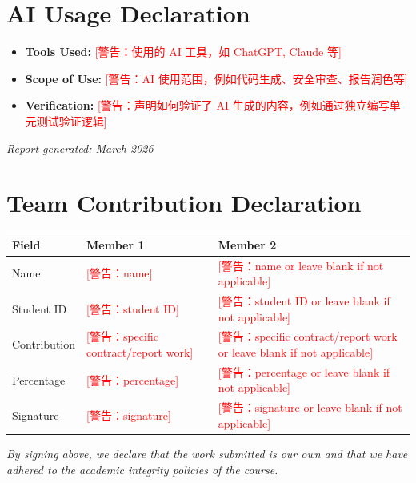 \documentclass[10pt,a4paper]{article}
\newcommand{\fillin}[1]{\textcolor{red}{[警告：#1]}}
\begin{document}
\section*{AI Usage Declaration}
\begin{itemize}
  \item \textbf{Tools Used:} \fillin{使用的 AI 工具，如 ChatGPT, Claude 等}
  \item \textbf{Scope of Use:} \fillin{AI 使用范围，例如代码生成、安全审查、报告润色等}
  \item \textbf{Verification:} \fillin{声明如何验证了 AI 生成的内容，例如通过独立编写单元测试验证逻辑}
\end{itemize}

\textit{Report generated: March 2026}

\newpage
\section*{Team Contribution Declaration}
\begin{tabularx}{\textwidth}{|>{\raggedright\arraybackslash}p{}|>{\raggedright\arraybackslash}X|>{\raggedright\arraybackslash}X|}
\hline
\textbf{Field} & \textbf{Member 1} & \textbf{Member 2} \\
\hline
Name & \fillin{name} & \fillin{name or leave blank if not applicable} \\
\hline
Student ID & \fillin{student ID} & \fillin{student ID or leave blank if not applicable} \\
\hline
Contribution & \fillin{specific contract/report work} & \fillin{specific contract/report work or leave blank if not applicable} \\
\hline
Percentage & \fillin{percentage} & \fillin{percentage or leave blank if not applicable} \\
\hline
Signature & \fillin{signature} & \fillin{signature or leave blank if not applicable} \\
\hline
\end{tabularx}

\vspace{1em}
\textit{By signing above, we declare that the work submitted is our own and that we have adhered to the academic integrity policies of the course.}
\end{document}
